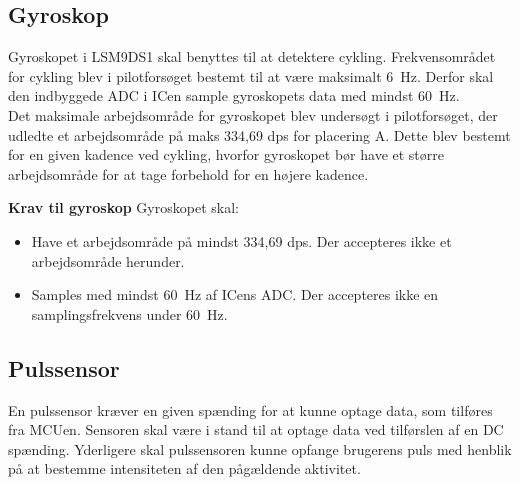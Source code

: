 \subsection{Gyroskop} \label{krav:gyro}
Gyroskopet i LSM9DS1 skal benyttes til at detektere cykling. Frekvensområdet for cykling blev i pilotforsøget bestemt til at være maksimalt 6~Hz. Derfor skal den indbyggede ADC i ICen sample gyroskopets data med mindst 60~Hz. \\
Det maksimale arbejdsområde for gyroskopet blev undersøgt i pilotforsøget, der udledte et arbejdsområde på maks 334,69 dps for placering A. Dette blev bestemt for en given kadence ved cykling, hvorfor gyroskopet bør have et større arbejdsområde for at tage forbehold for en højere kadence. %

\textbf{Krav til gyroskop} \newline
Gyroskopet skal:
\begin{itemize}
\item Have et arbejdsområde på mindst 334,69 dps. Der accepteres ikke et arbejdsområde herunder.
\item Samples med mindst 60~Hz af ICens ADC. Der accepteres ikke en samplingsfrekvens under 60~Hz.
\end{itemize}

\subsection{Pulssensor} \label{puls_krav}
En pulssensor kræver en given spænding for at kunne optage data, som tilføres fra MCUen. Sensoren skal være i stand til at optage data ved tilførslen af en DC spænding. %
Yderligere skal pulssensoren kunne opfange brugerens puls med henblik på at bestemme intensiteten af den pågældende aktivitet.

